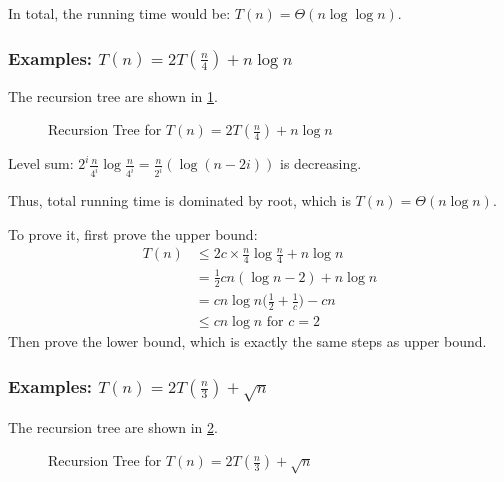In total, the running time would be: $T(n) = \Theta(n\log\log n)$.


\subsubsection{Examples: \texorpdfstring{$T(n)=2T(\frac{n}{4}) + n\log n$}{T(n)=2T(n/4) + n log n}}
The recursion tree are shown in \cref{fig:rt2}.
\begin{figure}[H]
    \caption{Recursion Tree for \texorpdfstring{$T(n)=2T(\frac{n}{4}) + n\log n$}{T(n)=2T(n/4) + n log n}}
    \label{fig:rt2}
    \centering
{}
\end{figure}

Level sum: $\displaystyle 2^i \frac{n}{4^i} \log\frac{n}{4^i} = \frac{n}{2^i}(\log (n-2i))$
is decreasing.

Thus, total running time is dominated by root, which is $T(n) = \Theta(n \log n)$.

To prove it, first prove the upper bound:
\begin{align*}
    T(n) &\leq 2c \times \frac{n}{4}\log\frac{n}{4} + n \log n \\
         &= \frac{1}{2}cn(\log n-2)+n \log n\\
         &= cn\log n \bigg(\frac{1}{2}+\frac{1}{c}\bigg) - cn \\
         &\leq cn\log n \text{ for } c = 2
\end{align*}
Then prove the lower bound, which is exactly the same steps as upper bound.


\subsubsection{Examples: \texorpdfstring{$T(n)=2T(\frac{n}{3}) + \sqrt{n}$}{T(n)=2T(n/3) + sqrt(n)}}
The recursion tree are shown in \cref{fig:rt3}.
\begin{figure}[H]
    \caption{Recursion Tree for \texorpdfstring{$T(n)=2T(\frac{n}{3}) + \sqrt{n}$}{T(n)=2T(n/3) + sqrt(n)}}
    \label{fig:rt3}
    \centering
{}
\end{figure}

